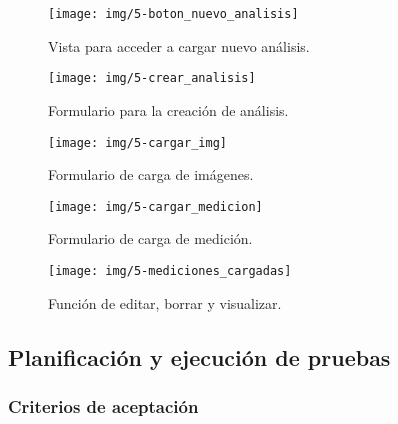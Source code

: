     
    \begin{figure}[h]
        \centering
        \texttt{[image: img/5-boton\_nuevo\_analisis]}
        \caption{Vista para acceder a cargar nuevo análisis.}
		\label{5-boton_nuevo_analisis}
    \end{figure}
    
    \begin{figure}[h]
        \centering
        \texttt{[image: img/5-crear\_analisis]}
        \caption{Formulario para la creación de análisis.}
		\label{5-crear_analisis}
    \end{figure}
    
    \begin{figure}[h]
        \centering
        \texttt{[image: img/5-cargar\_img]}
        \caption{Formulario de carga de imágenes.}
		\label{5-cargar_img}
    \end{figure}
    \begin{figure}[h]
        \centering
        \texttt{[image: img/5-cargar\_medicion]}
        \caption{Formulario de carga de medición.}
		\label{5-cargar_medicion}
    \end{figure}

    \begin{figure}[h]
        \centering
        \texttt{[image: img/5-mediciones\_cargadas]}
        \caption{Función de editar, borrar y visualizar.}
		\label{5-mediciones_cargadas}
    \end{figure}


\clearpage
\subsection{Planificación y ejecución de pruebas}
\label{s6_planificacion_pruebas}
\subsubsection{Criterios de aceptación}

